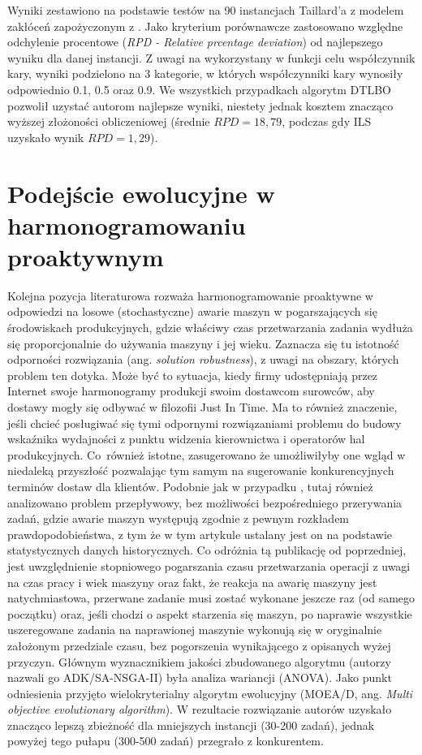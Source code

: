 \documentclass[printmode,oneside]{mgr}
\begin{document}
Wyniki zestawiono na podstawie testów na 90 instancjach Taillard'a z modelem zakłóceń zapożyczonym z \cite{Katragjini2013}. Jako kryterium porównawcze zastosowano względne odchylenie procentowe (\emph{RPD - Relative prcentage deviation}) od najlepszego wyniku dla danej instancji. Z uwagi na wykorzystany w funkcji celu współczynnik kary, wyniki podzielono na 3 kategorie, w których współczynniki kary wynosiły odpowiednio 0.1, 0.5 oraz 0.9. We wszystkich przypadkach algorytm DTLBO pozwolił uzystać autorom najlepsze wyniki, niestety jednak kosztem znacząco wyższej złożoności obliczeniowej (średnie $RPD = 18,79$, podczas gdy ILS uzyskało wynik $RPD = 1,29$).
%
\section[Podejście ewolucyjne w harmonogramowaniu  proaktywnym]{Podejście ewolucyjne w harmonogramowaniu\\ proaktywnym}
Kolejna pozycja literaturowa \cite{KBEPS} rozważa harmonogramowanie proaktywne w odpowiedzi na losowe (stochastyczne) awarie maszyn w pogarszających się środowiskach produkcyjnych, gdzie właściwy czas przetwarzania zadania wydłuża się proporcjonalnie do używania maszyny i jej wieku. Zaznacza się tu istotność odporności rozwiązania (ang. \emph{solution robustness}), z uwagi na obszary, których problem ten dotyka. Może być to sytuacja, kiedy firmy udostępniają przez Internet swoje harmonogramy produkcji swoim dostawcom surowców, aby dostawy mogły się odbywać w filozofii Just In Time. Ma to również znaczenie, jeśli chcieć posługiwać się tymi odpornymi rozwiązaniami problemu do budowy wskaźnika wydajności z punktu widzenia kierownictwa i operatorów hal produkcyjnych. \mbox{Co również} istotne, zasugerowano że umożliwiłyby one wgląd w niedaleką przyszłość pozwalając tym samym na sugerowanie konkurencyjnych terminów dostaw dla klientów. Podobnie jak w przypadku \cite{DTLBO}, tutaj również analizowano problem przepływowy, bez możliwości bezpośredniego przerywania zadań, gdzie awarie maszyn występują zgodnie z pewnym rozkładem prawdopodobieństwa, z tym że w tym artykule ustalany jest on na podstawie statystycznych danych historycznych. Co odróżnia tą publikację od poprzedniej, jest uwzględnienie stopniowego pogarszania czasu przetwarzania operacji z uwagi na czas pracy i wiek maszyny oraz fakt, że reakcja na awarię maszyny jest natychmiastowa, przerwane zadanie musi zostać wykonane jeszcze raz (od samego początku) oraz, jeśli chodzi o aspekt starzenia się maszyn, po naprawie wszystkie uszeregowane zadania na naprawionej maszynie wykonują się w oryginalnie założonym przedziale czasu, bez pogorszenia wynikającego z opisanych wyżej przyczyn. Głównym wyznacznikiem jakości zbudowanego algorytmu (autorzy nazwali go ADK/SA-NSGA-II) była analiza wariancji (ANOVA). Jako punkt odniesienia przyjęto wielokryterialny algorytm ewolucyjny (MOEA/D, ang. \emph{Multi objective evolutionary algorithm}). W rezultacie rozwiązanie autorów uzyskało znacząco lepszą zbieżność dla mniejszych instancji (30-200 zadań), jednak powyżej tego pułapu (300-500 zadań) przegrało z konkurentem.  
%
\end{document}
